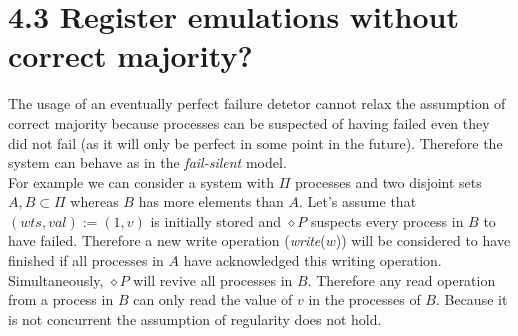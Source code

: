 \documentclass{article}
\begin{document}
	\section*{4.3 Register emulations without correct majority?}
	\begin{adjustwidth}{2em}{2em}
		The usage of an eventually perfect failure detetor cannot relax the assumption of correct majority because processes can be suspected of having failed even they did not fail (as it will only be perfect in some point in the future). Therefore the system can behave as in the \textit{fail-silent} model. \\
		For example we can consider a system with $\Pi$ processes and two disjoint sets $A,B \subset \Pi$ whereas $B$ has more elements than $A$. Let's assume that $(wts, val) := (1,v)$ is initially stored and $\diamond P$ suspects every process in $B$ to have failed. Therefore a new write operation (\textit{write}($w$)) will be considered to have finished if all processes in $A$ have acknowledged this writing operation. Simultaneously, $\diamond P$ will revive all processes in $B$. Therefore any read operation from a process in $B$ can only read the value of $v$ in the processes of $B$. Because it is not concurrent the assumption of regularity does not hold.
	\end{adjustwidth}
\end{document}
